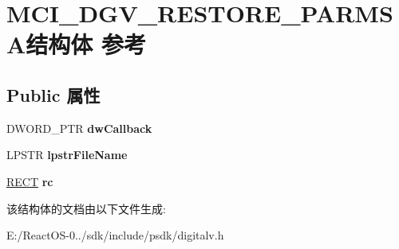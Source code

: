 \hypertarget{struct_m_c_i___d_g_v___r_e_s_t_o_r_e___p_a_r_m_s_a}{}\section{M\+C\+I\+\_\+\+D\+G\+V\+\_\+\+R\+E\+S\+T\+O\+R\+E\+\_\+\+P\+A\+R\+M\+S\+A结构体 参考}
\label{struct_m_c_i___d_g_v___r_e_s_t_o_r_e___p_a_r_m_s_a}
\subsection*{Public 属性}
\begin{DoxyCompactItemize}
\item 
\mbox{\label{struct_m_c_i___d_g_v___r_e_s_t_o_r_e___p_a_r_m_s_a_a303bc14ccfb39bba47e0f6e11dbdd30f}} 
D\+W\+O\+R\+D\+\_\+\+P\+TR {\bfseries dw\+Callback}
\item 
\mbox{\label{struct_m_c_i___d_g_v___r_e_s_t_o_r_e___p_a_r_m_s_a_a4883dc417edbbe75b93db3651a9bac5e}} 
L\+P\+S\+TR {\bfseries lpstr\+File\+Name}
\item 
\mbox{\label{struct_m_c_i___d_g_v___r_e_s_t_o_r_e___p_a_r_m_s_a_a91ccbd3940eeb7be95088bab45dc1042}} 
\hyperlink{structtag_r_e_c_t}{R\+E\+CT} {\bfseries rc}
\end{DoxyCompactItemize}


该结构体的文档由以下文件生成\+:\begin{DoxyCompactItemize}
\item 
E\+:/\+React\+O\+S-\/0../sdk/include/psdk/digitalv.\+h\end{DoxyCompactItemize}
